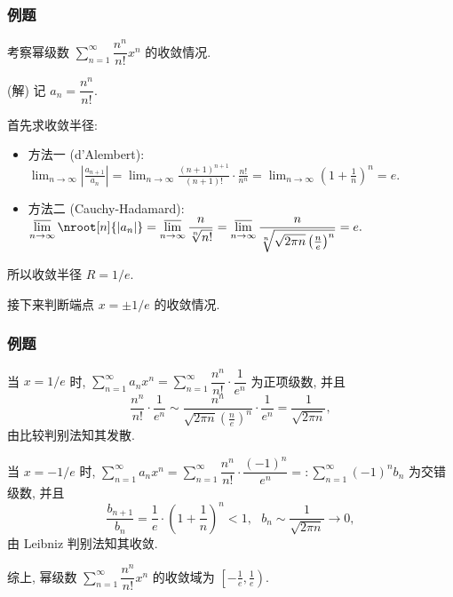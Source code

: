 
\begin{frame}
\frametitle{例题}

\begin{eg}
考察幂级数 $\displaystyle \sum_{n=1}^{\infty} \dfrac{n^n}{n!} x^n$ 的收敛情况.
\end{eg}

\pause
\vspace{1em}

\startproof[bg=yellow, fg=red](解)
记 $a_n = \dfrac{n^n}{n!}.$

\vspace{1em}

{\color{red} } 首先求收敛半径:
\begin{itemize}
\item 方法一 (d'Alembert): $\displaystyle \lim_{n\to\infty} \left| \frac{a_{n+1}}{a_n} \right| = \lim_{n\to\infty} \frac{(n+1)^{n+1}}{(n+1)!} \cdot \frac{n!}{n^n} = \lim_{n\to\infty} \left( 1 + \frac{1}{n} \right)^n = e.$
\item 方法二 (Cauchy-Hadamard): $\displaystyle \varlimsup_{n\to\infty} \nroot[n]{|a_n|} = \varlimsup_{n\to\infty} \frac{n}{\sqrt[n]{n!}} = \varlimsup_{n\to\infty} \frac{n}{\sqrt[n]{\sqrt{2\pi n} \left( \frac{n}{e} \right)^n}} = e.$
\end{itemize}
所以收敛半径 $R = 1/e.$

\pause
\vspace{1em}

接下来判断端点 $x = \pm 1/e$ 的收敛情况.

\end{frame}


\begin{frame}
\frametitle{例题}

{\color{red} } 当 $x = 1/e$ 时, $\sum_{n=1}^{\infty} a_n x^n = \sum_{n=1}^{\infty} \dfrac{n^n}{n!} \cdot \dfrac{1}{e^n}$ 为正项级数, 并且
\[
\dfrac{n^n}{n!} \cdot \dfrac{1}{e^n} \sim \dfrac{n^n}{\sqrt{2\pi n} \left( \frac{n}{e} \right)^n} \cdot \dfrac{1}{e^n} = \dfrac{1}{\sqrt{2\pi n}},
\]
由比较判别法知其发散.

\pause
\vspace{1em}

{\color{red} } 当 $x = -1/e$ 时, $\sum_{n=1}^{\infty} a_n x^n = \sum_{n=1}^{\infty} \dfrac{n^n}{n!} \cdot \dfrac{(-1)^n}{e^n} =: \sum_{n=1}^{\infty} (-1)^n b_n$ 为交错级数, 并且
\[
\frac{b_{n+1}}{b_n} = \frac{1}{e} \cdot \left( 1 + \frac{1}{n} \right)^n  < 1, ~~~ b_n \sim \dfrac{1}{\sqrt{2\pi n}} \to 0,
\]
由 Leibniz 判别法知其收敛.

\pause
\vspace{1em}

综上, 幂级数 $\displaystyle \sum_{n=1}^{\infty} \dfrac{n^n}{n!} x^n$ 的收敛域为 $\left[ -\frac{1}{e}, \frac{1}{e} \right).$

\end{frame}

